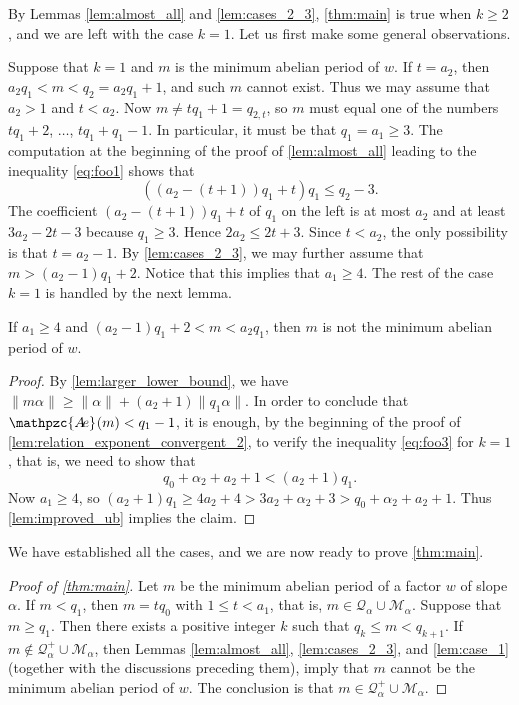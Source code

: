 \documentclass[a4paper,fleqn]{article}
\providecommand{\norm}[1]{\lVert#1\rVert}
\newcommand{\abexp}[2][]{\mathpzc{A\mkern-3mu e}_{#1}(#2)}
\newcommand{\qk}[1]{\mathcal{Q}_{#1}}
\newcommand{\qkl}[1]{\mathcal{Q}^+_{#1}}
\begin{document}
  By Lemmas \ref{lem:almost_all} and \ref{lem:cases_2_3}, \autoref{thm:main} is true when $k \geq 2$, and we are left
  with the case $k = 1$. Let us first make some general observations.

  Suppose that $k = 1$ and $m$ is the minimum abelian period of $w$. If $t = a_2$, then
  $a_2 q_1 < m < q_2 = a_2 q_1 + 1$, and such $m$ cannot exist. Thus we may assume that $a_2 > 1$ and $t < a_2$. Now
  $m \neq tq_1 + 1 = q_{2,t}$, so $m$ must equal one of the numbers $tq_1 + 2$, $\ldots$, $tq_1 + q_1 - 1$. In
  particular, it must be that $q_1 = a_1 \geq 3$. The computation at the beginning of the proof of
  \autoref{lem:almost_all} leading to the inequality \eqref{eq:foo1} shows that
  \begin{equation*}
    ((a_2 - (t + 1))q_1 + t)q_1 \leq q_2 - 3.
  \end{equation*}
  The coefficient $(a_2 - (t + 1))q_1 + t$ of $q_1$ on the left is at most $a_2$ and at least $3a_2 - 2t - 3$ because
  $q_1 \geq 3$. Hence $2a_2 \leq 2t + 3$. Since $t < a_2$, the only possibility is that $t = a_2 - 1$. By
  \autoref{lem:cases_2_3}, we may further assume that $m > (a_2 - 1)q_1 + 2$. Notice that this implies that
  $a_1 \geq 4$. The rest of the case $k = 1$ is handled by the next lemma.

  \begin{lemma}\label{lem:case_1}
    If $a_1 \geq 4$ and $(a_2 - 1)q_1 + 2 < m < a_2 q_1$, then $m$ is not the minimum abelian period of $w$.
  \end{lemma}
  \begin{proof}
    By \autoref{lem:larger_lower_bound}, we have $\norm{m\alpha} \geq \norm{\alpha} + (a_2 + 1)\norm{q_1\alpha}$. In
    order to conclude that $\abexp{m} < q_1 - 1$, it is enough, by the beginning of the proof of
    \autoref{lem:relation_exponent_convergent_2}, to verify the inequality \eqref{eq:foo3} for $k = 1$, that is, we
    need to show that
    \begin{equation*}
      q_0 + \alpha_2 + a_2 + 1 < (a_2 + 1)q_1.
    \end{equation*}
    Now $a_1 \geq 4$, so $(a_2 + 1)q_1 \geq 4a_2 + 4 > 3a_2 + \alpha_2 + 3 > q_0 + \alpha_2 + a_2 + 1$. Thus
    \autoref{lem:improved_ub} implies the claim.
  \end{proof}

  We have established all the cases, and we are now ready to prove \autoref{thm:main}.

  \begin{proof}[Proof of \autoref{thm:main}]
    Let $m$ be the minimum abelian period of a factor $w$ of slope $\alpha$. If $m < q_1$, then $m = t q_0$ with
    $1 \leq t < a_1$, that is, $m \in \qk{\alpha} \cup \mathcal{M}_\alpha$. Suppose that $m \geq q_1$. Then there
    exists a positive integer $k$ such that $q_k \leq m < q_{k+1}$. If $m \notin \qkl{\alpha} \cup \mathcal{M}_\alpha$,
    then Lemmas \ref{lem:almost_all}, \ref{lem:cases_2_3}, and \ref{lem:case_1} (together with the discussions
    preceding them), imply that $m$ cannot be the minimum abelian period of $w$. The conclusion is that
    $m \in \qkl{\alpha} \cup \mathcal{M}_\alpha$.
  \end{proof}
\end{document}
